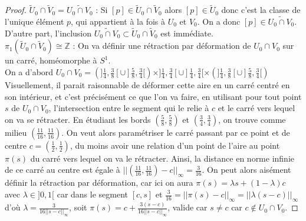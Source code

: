 \begin{proof}
    \textit{$\tilde{U}_0\cap\tilde{V}_0=\widetilde{U_0\cap V_0}$} : Si $[p]\in\tilde{U}_0\cap\tilde{V}_0$ alors $[p]\in\tilde{U}_0$ donc c'est la classe de l'unique élément $p$, qui appartient à la fois à $U_0$ et $V_0$. On a donc $[p]\in\widetilde{U_0\cap V_0}$. D'autre part, l'inclusion $\widetilde{U_0\cap V_0}\subset\tilde{U}_0\cap\tilde{V}_0$ est immédiate.\medskip\\
    \textit{$\pi_1(\tilde{U}_0\cap\tilde{V}_0)\cong\mathbb{Z}$} : On va définir une rétraction par déformation de $U_0\cap V_0$ sur un carré, homéomorphe à $S^1$.\\
    On a d'abord $U_0\cap V_0=\left(]\frac{1}{4},\frac{3}{8}[\cup]\frac{5}{8},\frac{3}{4}[\right)\times]\frac{1}{4},\frac{3}{4}[\cup]\frac{1}{4},\frac{3}{4}[\times\left(]\frac{1}{4},\frac{3}{8}[\cup]\frac{5}{8},\frac{3}{4}[\right)$\medskip\\
    Visuellement, il parait raisonnable de déformer cette aire en un carré centré en son intérieur, et c'est précisément ce que l'on va faire, en utilisant pour tout point $s$ de $U_0\cap V_0$, l'intersection entre le segment qui le relie à $c$ et le carré vers lequel on va se rétracter. En étudiant les bords $(\frac{5}{8},\frac{5}{8})$ et $(\frac{3}{4},\frac{3}{4})$, on trouve comme milieu $(\frac{11}{16},\frac{11}{16})$. On veut alors paramétriser le carré passant par ce point et de centre $c=(\frac{1}{2},\frac{1}{2})$, du moins avoir une relation d'un point de l'aire au point $\pi(s)$ du carré vers lequel on va le rétracter. Ainsi, la distance en norme infinie de ce carré au centre est égale à $||(\frac{11}{16},\frac{11}{16})-c||_{\infty}=\frac{3}{16}$. On peut alors aisément définir la rétraction par déformation, car ici on aura $\pi(s)=\lambda s+(1-\lambda)c$ avec $\lambda\in]0,1[$ car dans le segment $[c,s]$ et $\frac{3}{16}=||\pi(s)-c||_{\infty}=||\lambda(s-c)||_{\infty}$ d'où $\lambda=\frac{3}{16||s-c||_{\infty}}$, soit $\pi(s)=c+\displaystyle\frac{3(s-c)}{16||s-c||_{\infty}}$, valide car $s\neq c$ car $c\not\in U_0\cap V_0$.
    

\end{proof}
